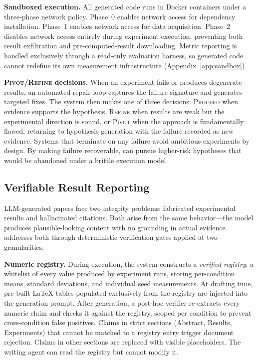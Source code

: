 \noindent \textbf{Sandboxed execution.}
All generated code runs in Docker containers under a three-phase network policy.
Phase~0 enables network access for dependency installation.
Phase~1 enables network access for data acquisition.
Phase~2 disables network access entirely during experiment execution, preventing both result exfiltration and pre-computed-result downloading.
Metric reporting is handled exclusively through a read-only evaluation harness, so generated code cannot redefine its own measurement infrastructure (Appendix~\ref{app:sandbox}).

\noindent \textbf{\textsc{Pivot}/\textsc{Refine} decisions.}
When an experiment fails or produces degenerate results, an automated repair loop captures the failure signature and generates targeted fixes.
The system then makes one of three decisions: \textsc{Proceed} when evidence supports the hypothesis, \textsc{Refine} when results are weak but the experimental direction is sound, or \textsc{Pivot} when the approach is fundamentally flawed, returning to hypothesis generation with the failure recorded as new evidence.
Systems that terminate on any failure avoid ambitious experiments by design.
By making failure recoverable, \system{} can pursue higher-risk hypotheses that would be abandoned under a brittle execution model.

\vspace{-0.3em}
\subsection{Verifiable Result Reporting}
\label{sec:verification}
\vspace{-0.3em}

LLM-generated papers face two integrity problems: fabricated experimental results and hallucinated citations.
Both arise from the same behavior---the model produces plausible-looking content with no grounding in actual evidence.
\system{} addresses both through deterministic verification gates applied at two granularities.

\noindent \textbf{Numeric registry.}
During execution, the system constructs a \emph{verified registry}: a whitelist of every value produced by experiment runs, storing per-condition means, standard deviations, and individual seed measurements.
At drafting time, pre-built \LaTeX{} tables populated exclusively from the registry are injected into the generation prompt.
After generation, a post-hoc verifier re-extracts every numeric claim and checks it against the registry, scoped per condition to prevent cross-condition false positives.
Claims in strict sections (Abstract, Results, Experiments) that cannot be matched to a registry entry trigger document rejection.
Claims in other sections are replaced with visible placeholders.
The writing agent can read the registry but cannot modify it.


